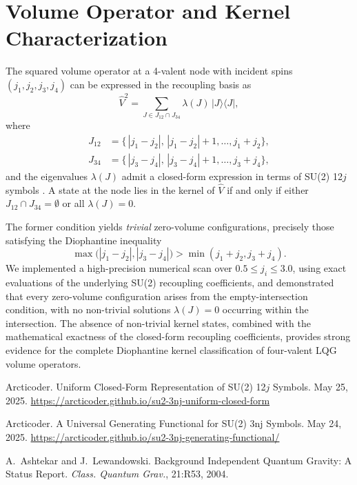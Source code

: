 \documentclass{article}
\begin{document}
\section{Volume Operator and Kernel Characterization}
The squared volume operator at a 4-valent node with incident spins $(j_1,j_2,j_3,j_4)$ can be expressed in the recoupling basis as
\begin{equation}
\hat{V}^2 = \sum_{J\in J_{12}\cap J_{34}} \lambda(J)\,\bigl|J\bigr\rangle\bigl\langle J\bigr|,
\end{equation}
where
\begin{align}
J_{12} &= \{\,|j_1 - j_2|,\,|j_1 - j_2|+1,\dots,j_1+j_2\}, \\
J_{34} &= \{\,|j_3 - j_4|,\,|j_3 - j_4|+1,\dots,j_3+j_4\},
\end{align}
and the eigenvalues $\lambda(J)$ admit a closed-form expression in terms of SU(2) 12$j$ symbols \cite{Arcticoder2025Uniform12j}. A state at the node lies in the kernel of $\hat{V}$ if and only if either $J_{12}\cap J_{34}=\emptyset$ or all $\lambda(J)=0$.

The former condition yields \emph{trivial} zero-volume configurations, precisely those satisfying the Diophantine inequality
\begin{equation}
\max\bigl(|j_1-j_2|,|j_3-j_4|\bigr) > \min(j_1+j_2,j_3+j_4).
\end{equation}
We implemented a high-precision numerical scan over $0.5\le j_i\le3.0$, using exact evaluations of the underlying SU(2) recoupling coefficients, and demonstrated that every zero-volume configuration arises from the empty-intersection condition, with no non-trivial solutions $\lambda(J)=0$ occurring within the intersection. The absence of non-trivial kernel states, combined with the mathematical exactness of the closed-form recoupling coefficients, provides strong evidence for the complete Diophantine kernel classification of four-valent LQG volume operators.

\begin{thebibliography}{9}
Arcticoder.
\newblock Uniform Closed-Form Representation of SU(2) 12$j$ Symbols.
\newblock May 25, 2025.
\newblock \url{https://arcticoder.github.io/su2-3nj-uniform-closed-form}

Arcticoder.
\newblock A Universal Generating Functional for SU(2) 3nj Symbols.
\newblock May 24, 2025.
\newblock \url{https://arcticoder.github.io/su2-3nj-generating-functional/}

A.~Ashtekar and J.~Lewandowski.
\newblock Background Independent Quantum Gravity: A Status Report.
\newblock \emph{Class. Quantum Grav.}, 21:R53, 2004.
\end{thebibliography}
\end{document}
